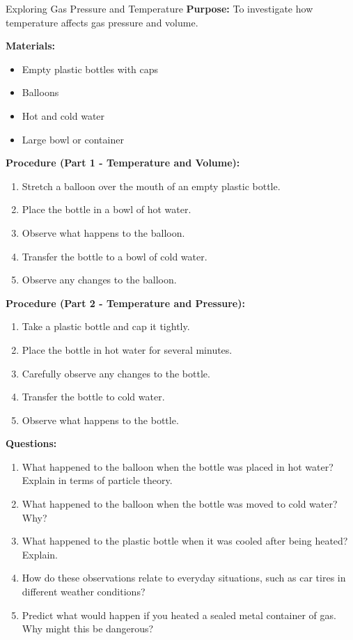 
\begin{investigation}{Exploring Gas Pressure and Temperature}
\textbf{Purpose:} To investigate how temperature affects gas pressure and volume.

\textbf{Materials:}
\begin{itemize}
    \item Empty plastic bottles with caps
    \item Balloons
    \item Hot and cold water
    \item Large bowl or container
\end{itemize}

\textbf{Procedure (Part 1 - Temperature and Volume):}
\begin{enumerate}
    \item Stretch a balloon over the mouth of an empty plastic bottle.
    \item Place the bottle in a bowl of hot water.
    \item Observe what happens to the balloon.
    \item Transfer the bottle to a bowl of cold water.
    \item Observe any changes to the balloon.
\end{enumerate}

\textbf{Procedure (Part 2 - Temperature and Pressure):}
\begin{enumerate}
    \item Take a plastic bottle and cap it tightly.
    \item Place the bottle in hot water for several minutes.
    \item Carefully observe any changes to the bottle.
    \item Transfer the bottle to cold water.
    \item Observe what happens to the bottle.
\end{enumerate}

\textbf{Questions:}
\begin{enumerate}
    \item What happened to the balloon when the bottle was placed in hot water? Explain in terms of particle theory.
    \item What happened to the balloon when the bottle was moved to cold water? Why?
    \item What happened to the plastic bottle when it was cooled after being heated? Explain.
    \item How do these observations relate to everyday situations, such as car tires in different weather conditions?
    \item Predict what would happen if you heated a sealed metal container of gas. Why might this be dangerous?
\end{enumerate}
\end{investigation}

